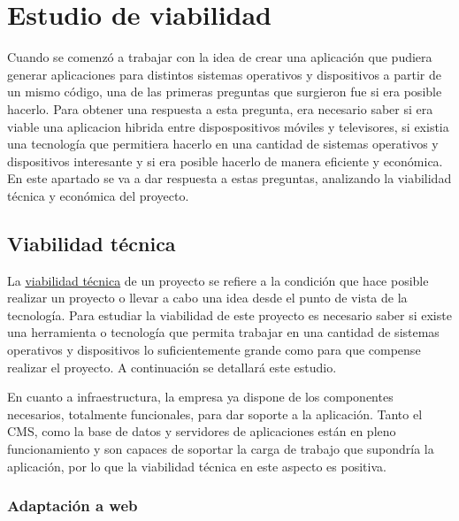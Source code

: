 \section{Estudio de viabilidad}
\label{sec:analisis_estudio_viabilidad}

Cuando se comenzó a trabajar con la idea de crear una aplicación que pudiera generar aplicaciones
para distintos sistemas operativos y dispositivos a partir de un mismo código, una de las primeras
preguntas que surgieron fue si era posible hacerlo. Para obtener una respuesta a esta pregunta, era 
necesario saber si era viable una aplicacion hibrida entre dispospositivos móviles y televisores, 
si existia una tecnología que permitiera hacerlo en una cantidad de sistemas operativos y dispositivos
interesante y si era posible hacerlo de manera eficiente y económica. En este apartado se va a dar respuesta
a estas preguntas, analizando la viabilidad técnica y económica del proyecto.

\subsection{Viabilidad técnica}
\label{subsec:analisis_estudio_viabilidad_tecnica}

La \href{https://es.wikipedia.org/wiki/Viabilidad_t%C3%A9cnica#:~:text=Condici%C3%B3n%20que%20hace%20posible%20el,leyes%20de%20la%20naturaleza%20involucradas.}{viabilidad técnica} 
de un proyecto se refiere a la condición que hace posible realizar un proyecto o llevar a cabo una idea
desde el punto de vista de la tecnología. Para estudiar la viabilidad de este proyecto es necesario saber
si existe una herramienta o tecnología que permita trabajar en una cantidad de sistemas operativos y dispositivos
lo suficientemente grande como para que compense realizar el proyecto. A continuación se detallará este estudio. 

En cuanto a infraestructura, la empresa ya dispone de los componentes necesarios, totalmente funcionales, 
para dar soporte a la aplicación. Tanto el CMS, como la base de datos y servidores de aplicaciones están
en pleno funcionamiento y son capaces de soportar la carga de trabajo que supondría la aplicación, por lo que
la viabilidad técnica en este aspecto es positiva.

\subsubsection{Adaptación a web}
\label{subsubsec:analisis_estudio_viabilidad_tecnica_aplicacion_web}

